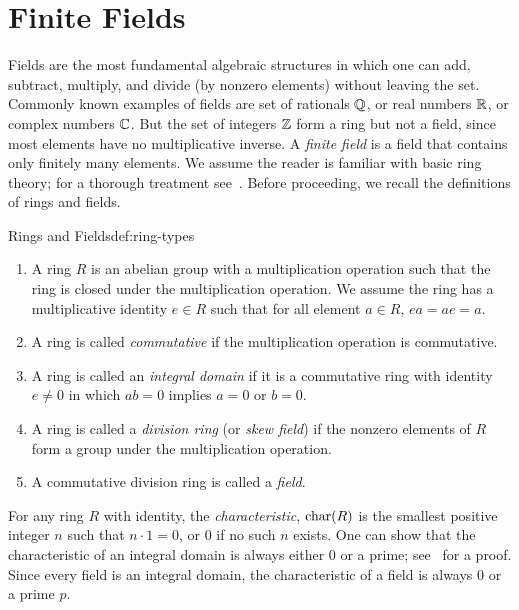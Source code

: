 \chapter{Finite Fields}

Fields are the most fundamental algebraic structures in which one can add, subtract, multiply, and divide (by nonzero elements) without leaving the set. Commonly known examples of fields are set of rationals $\mathbb{Q}$, or real numbers $\mathbb{R}$, or complex numbers $\mathbb{C}$. But the set of integers $\mathbb{Z}$ form a ring but not a field, since most elements have no multiplicative inverse. A \emph{finite field} is a field that contains only finitely many elements. We assume the reader is familiar with basic ring theory; for a thorough treatment see~\cite{Artin2011}. Before proceeding, we recall the definitions of rings and fields.

\begin{definition}{Rings and Fields}{def:ring-types}
  \begin{enumerate}[label={(\roman*)}]
    \item A ring $R$ is an abelian group with a multiplication operation such that the ring is closed under the multiplication operation. We assume the ring has a multiplicative identity $e\in R$ such that for all element $a\in R$, $ea=ae=a$. 
    \item A ring is called \emph{commutative} if the multiplication operation is commutative.
    \item A ring is called an \emph{integral domain} if it is a commutative ring with identity $e\neq 0$ in which $ab=0$ implies $a=0$ or $b=0$.
    \item A ring is called a \emph{division ring} (or \emph{skew field}) if the nonzero elements of $R$ form a group under the multiplication operation. 
    \item A commutative division ring is called a \emph{field}.
  \end{enumerate}
\end{definition}

For any ring $R$ with identity, the \emph{characteristic}, $\operatorname{char}(R)$ is the smallest positive integer $n$ such that $n\cdot 1=0$, or $0$ if no such $n$ exists. One can show that the characteristic of an integral domain is always either $0$ or a prime; see~\cite{Artin2011} for a proof. Since every field is an integral domain, the characteristic of a field is always $0$ or a prime $p$.



